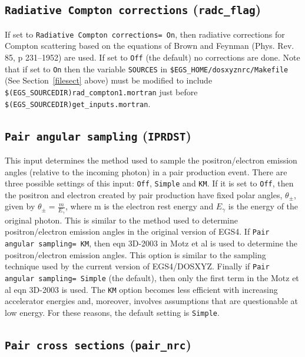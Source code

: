 \documentclass[12pt,twoside]{article}      %
\begin{document}
\subsection{{\tt Radiative Compton corrections} ({\tt radc\_flag})}

If set to {\tt Radiative Compton corrections= On}, then radiative
corrections for Compton scattering based on the equations
of Brown and Feynman (Phys. Rev. 85, p 231--1952) are used.
If set to {\tt Off} (the default) no corrections are done.
Note that if set to {\tt On} then the variable {\tt SOURCES} in
{\tt \$EGS\_HOME/dosxyznrc/Makefile} (See Section~\ref{filesect} above)
must be modified to include {\tt \$(EGS\_SOURCEDIR)rad\_compton1.mortran} just
before {\tt \$(EGS\_SOURCEDIR)get\_inputs.mortran}.

\subsection{{\tt Pair angular sampling} ({\tt IPRDST})}

This input determines the method used to sample the positron/electron emission
angles (relative to the incoming photon) in a pair production event.  There
are three possible settings of this input: {\tt Off}, {\tt Simple} and {\tt KM}.
If it is set to {\tt Off}, then the positron and electron created by pair
production have fixed polar angles, $\theta_{\pm}$, given by
$\theta_{\pm}=\frac{m}{E_{\gamma}}$, where m is the electron rest energy
and $E_{\gamma}$
 is the energy of the original photon.  This is similar to the method used to determine
positron/electron emission angles in the original version of EGS4.
If {\tt Pair angular sampling= KM}, then eqn 3D-2003 in
Motz et al\cite{Mo69} is used to determine the positron/electron emission
angles.  This option is similar to the sampling technique used by the current
version of EGS4/DOSXYZ.  Finally if {\tt Pair angular sampling= Simple} (the default), then only
the first term in the Motz et al eqn 3D-2003 is used.  The {\tt KM} option
becomes less efficient with increasing accelerator energies and, moreover, involves
assumptions that are questionable at low energy.  For these reasons, the default
setting is {\tt Simple}.


\subsection{ {\tt Pair cross sections} ({\tt pair\_nrc})}
\end{document}
